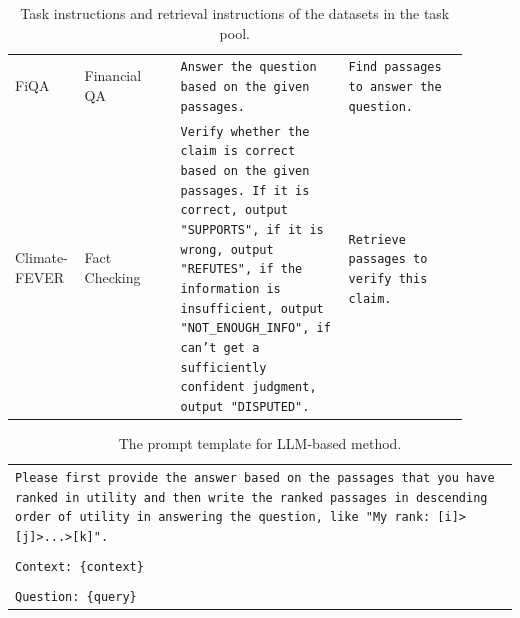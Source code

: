 \documentclass[11pt]{article}
\begin{document}
\begin{table}[p]
\begin{tabular}{p{0.1\linewidth}  p{0.2\linewidth}  p{0.35\linewidth}  p{0.25\linewidth}}
\hline


\multirow{3}{*}{FiQA} & \multirow{3}{*}{Financial QA} & \multirow{3}{\linewidth}{\texttt{Answer the question based on the given passages.}} & \multirow{3}{\linewidth}{\texttt{Find passages to answer the question.}} \\
& & & \\
& & & \\



\hline


\multirow{9}{\linewidth}{Climate-FEVER} & \multirow{9}{*}{Fact Checking} & \multirow{9}{\linewidth}{\texttt{Verify whether the claim is correct based on the given passages. If it is correct, output "SUPPORTS", if it is wrong, output "REFUTES", if the information is insufficient, output "NOT\_ENOUGH\_INFO", if can't get a sufficiently confident judgment, output "DISPUTED".}} & \multirow{9}{\linewidth}{\texttt{Retrieve passages to verify this claim.}} \\
& & & \\
& & & \\
& & & \\
& & & \\
& & & \\
& & & \\
& & & \\
& & & \\



\bottomrule
\end{tabular}
\caption{Task instructions and retrieval instructions of the datasets in the task pool.}
\label{tab:tb-6}
\end{table}








\begin{table}[h]
\centering
\small
\begin{tabular}{>{\raggedright\arraybackslash\tt}p{\linewidth}<{}}
\toprule
Please first provide the answer based on the passages that you have ranked in utility and then write the ranked passages in descending order of utility in answering the question, like "My rank: [i]>[j]>...>[k]".\\\\
Context: \color{blue}\{context\}\\\\
\color{black}Question: \color{blue}\{query\}\\
\bottomrule
\end{tabular}
\caption{The prompt template for LLM-based method.}
\label{tab:tb-7}
\end{table}
\end{document}
